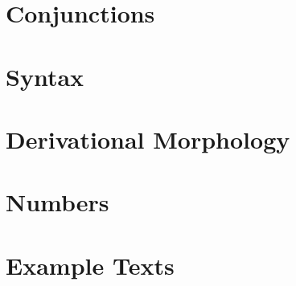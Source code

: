\documentclass[11pt,a4paper,titlepage]{article}
\begin{document}
	\section{Conjunctions}
		\lipsum[1]
	\section{Syntax}
		\lipsum[1]
	\section{Derivational Morphology}
		\lipsum[1]
	\section{Numbers}
		\lipsum[1]
	\section{Example Texts}
\end{document}
